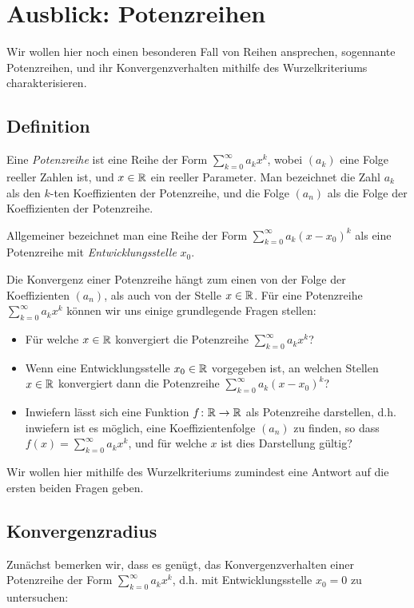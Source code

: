 \documentclass[a4paper,10pt]{article}
\begin{document}
\section{Ausblick: Potenzreihen}
Wir wollen hier noch einen besonderen Fall von Reihen ansprechen, sogennante Potenzreihen, und ihr Konvergenzverhalten mithilfe des Wurzelkriteriums charakterisieren.


\subsection{Definition}
\begin{defi}
 Eine \emph{Potenzreihe} ist eine Reihe der Form $\sum_{k=0}^\infty a_k x^k$, wobei $(a_k)$ eine Folge reeller Zahlen ist, und $x \in \mathbb{R}$ ein reeller Parameter. Man bezeichnet die Zahl $a_k$ als den $k$-ten Koeffizienten der Potenzreihe, und die Folge $(a_n)$ als die Folge der Koeffizienten der Potenzreihe.
 
 Allgemeiner bezeichnet man eine Reihe der Form $\sum_{k=0}^\infty a_k (x-x_0)^k$ als eine Potenzreihe mit \emph{Entwicklungsstelle} $x_0$.
\end{defi}


Die Konvergenz einer Potenzreihe hängt zum einen von der Folge der Koeffizienten $(a_n)$, als auch von der Stelle $x \in \mathbb{R}$. Für eine Potenzreihe $\sum_{k=0}^\infty a_k x^k$ können wir uns einige grundlegende Fragen stellen:
\begin{itemize}
 \item
  Für welche $x \in \mathbb{R}$ konvergiert die Potenzreihe $\sum_{k=0}^\infty a_k x^k$?
 \item
  Wenn eine Entwicklungsstelle $x_0 \in \mathbb{R}$ vorgegeben ist, an welchen Stellen $x \in \mathbb{R}$ konvergiert dann die Potenzreihe $\sum_{k=0}^\infty a_k (x-x_0)^k$?
 \item
  Inwiefern lässt sich eine Funktion $f \colon \mathbb{R} \to \mathbb{R}$ als Potenzreihe darstellen, d.h. inwiefern ist es möglich, eine Koeffizientenfolge $(a_n)$ zu finden, so dass $f(x) = \sum_{k=0}^\infty a_k x^k$, und für welche $x$ ist dies Darstellung gültig?
\end{itemize}


Wir wollen hier mithilfe des Wurzelkriteriums zumindest eine Antwort auf die ersten beiden Fragen geben.


\subsection{Konvergenzradius}
Zunächst bemerken wir, dass es genügt, das Konvergenzverhalten einer Potenzreihe der Form $\sum_{k=0}^\infty a_k x^k$, d.h. mit Entwicklungsstelle $x_0 = 0$ zu untersuchen:
\end{document}
